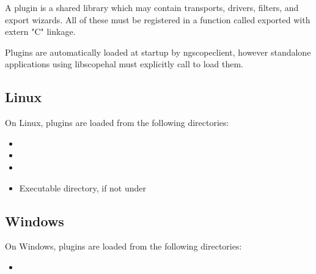 A plugin is a shared library which may contain transports, drivers, filters, and export wizards. All of these must be
registered in a function called  exported with extern "C" linkage.

Plugins are automatically loaded at startup by ngscopeclient, however standalone applications using libscopehal must
explicitly call  to load them.

\subsection{Linux}

On Linux, plugins are loaded from the following directories:

\begin{itemize}
\item {}
\item {}
\item {}
\item Executable directory, if not under 
\end{itemize}

\subsection{Windows}

On Windows, plugins are loaded from the following directories:

\begin{itemize}
\item {}
\end{itemize}
